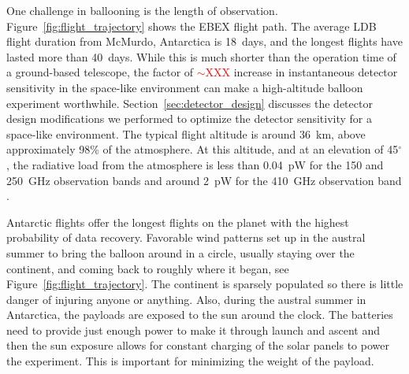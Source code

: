 One challenge in ballooning is the length of observation. 
Figure~\ref{fig:flight_trajectory} shows the \ac{EBEX} flight path. 
The average \ac{LDB} flight duration from McMurdo, Antarctica is 18~days, and the longest flights have lasted more than 40~days.  
While this is much shorter than the operation time of a ground-based telescope, the factor of \textcolor{red}{$\sim$XXX} increase in instantaneous detector sensitivity in the space-like environment can make a high-altitude balloon experiment worthwhile. 
Section~\ref{sec:detector_design} discusses the detector design modifications we performed to optimize the detector sensitivity for a space-like environment. 
The typical flight altitude is around 36~km, above approximately 98\% of the atmosphere. 
At this altitude, and at an elevation of 45$^\circ$, the radiative load from the atmosphere is less than 0.04~pW for the 150 and 250~GHz observation bands and around 2~pW for the 410~GHz observation band \cite{Bao2015}. 


Antarctic flights offer the longest flights on the planet with the highest probability of data recovery. 
Favorable wind patterns set up in the austral summer to bring the balloon around in a circle, usually staying over the continent, and coming back to roughly where it began, see Figure~\ref{fig:flight_trajectory}. 
The continent is sparsely populated so there is little danger of injuring anyone or anything. 
Also, during the austral summer in Antarctica, the payloads are exposed to the sun around the clock. 
The batteries need to provide just enough power to make it through launch and ascent and then the sun exposure allows for constant charging of the solar panels to power the experiment. 
This is important for minimizing the weight of the payload. 

